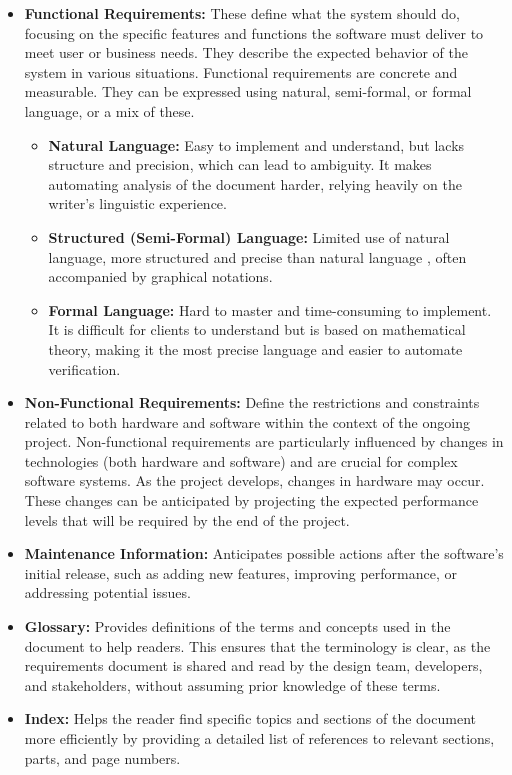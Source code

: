 \begin{itemize}
\item \textbf{Functional Requirements:} These define what the system should do, focusing on the specific features and functions the
software must deliver to meet user or business needs. They describe the expected behavior of the system in various situations.
Functional requirements are concrete and measurable. They can be expressed using natural, semi-formal, or formal language,
or a mix of these. 

\begin{itemize} 
\item \textbf{Natural Language:} Easy to implement and understand, but lacks structure and precision, which can lead to ambiguity.
It makes automating analysis of the document harder, relying heavily on the writer’s linguistic experience. 
\item \textbf{Structured (Semi-Formal) Language:} Limited use of natural language, more structured and precise than natural language
, often accompanied by graphical notations. 
\item \textbf{Formal Language:} Hard to master and time-consuming to implement. It is difficult for clients to understand but is based
on mathematical theory, making it the most precise language and easier to automate verification. 
\end{itemize}

\item \textbf{Non-Functional Requirements:} Define the restrictions and constraints related to both hardware and software within
the context of the ongoing project. Non-functional requirements are particularly influenced by changes in technologies 
(both hardware and software) and are crucial for complex software systems. As the project develops, changes in hardware may occur.
These changes can be anticipated by projecting the expected performance levels that will be required by the end of the project.
\item \textbf{Maintenance Information:} Anticipates possible actions after the software's initial release, such as adding
new features, improving performance, or addressing potential issues.
   \item \textbf{Glossary:} Provides definitions of the terms and concepts used in the document to help readers. This ensures
that the terminology is clear, as the requirements document is shared and read by the design team, developers, and stakeholders, 
without assuming prior knowledge of these terms.
  \item \textbf{Index:} Helps the reader find specific topics and sections of the document more efficiently by providing a
detailed list of references to relevant sections, parts, and page numbers.
\end{itemize}


